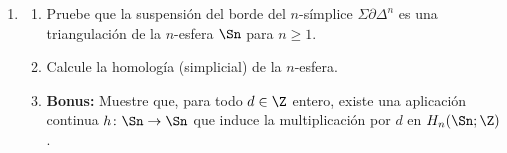 \documentclass[11pt, reqno]{amsart}
\begin{document}
\begin{enumerate}
	\item
		\begin{enumerate}
			\item Pruebe que la suspensión del borde del $n$-símplice $\Sigma\partial\Delta^n$ es una triangulación de la
				$n$-esfera $\Sn$ para $n \ge 1$.

			\item Calcule la homología (simplicial) de la $n$-esfera.

			\item \textbf{Bonus:}
				Muestre que, para todo $d \in \Z$ entero, existe una aplicación continua $h \colon \Sn \to \Sn$ que induce
				la multiplicación por $d$ en $H_n(\Sn; \Z)$.
		\end{enumerate}
\end{enumerate}

\printbibliography
\end{document}
